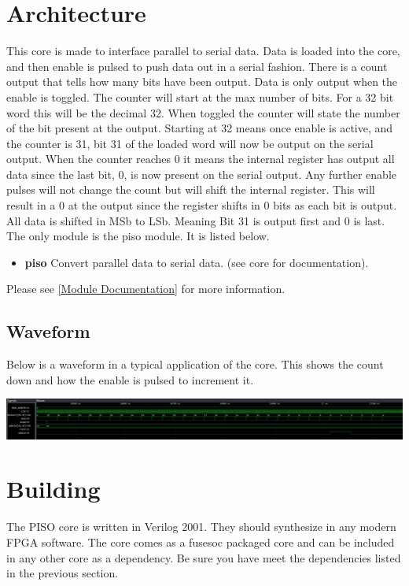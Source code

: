 \section{Architecture}
\par
This core is made to interface parallel to serial data. Data is loaded into the core, and then enable is pulsed to
push data out in a serial fashion. There is a count output that tells how many bits have been output. Data is only output
when the enable is toggled. The counter will start at the max number of bits. For a 32 bit word this will be the decimal 32.
When toggled the counter will state the number of the bit present at the output. Starting at 32 means once enable is active,
and the counter is 31, bit 31 of the loaded word will now be output on the serial output. When the counter reaches 0 it means
the internal register has output all data since the last bit, 0, is now present on the serial output. Any further enable
pulses will not change the count but will shift the internal register. This will result in a 0 at the output since the register
shifts in 0 bits as each bit is output. All data is shifted in MSb to LSb. Meaning Bit 31 is output first and 0 is last.
The only module is the piso module. It is listed below.

\begin{itemize}
  \item \textbf{piso} Convert parallel data to serial data. (see core for documentation).
\end{itemize}

Please see \ref{Module Documentation} for more information.

\subsection{Waveform}
Below is a waveform in a typical application of the core. This shows the count down and how the enable is pulsed to increment it.

\includegraphics[width=\textwidth]{src/diagrams/waveform.png}

\section{Building}

\par
The PISO core is written in Verilog 2001. They should synthesize in any modern FPGA software. The core comes as a fusesoc packaged core and can be included in any other core as a dependency. Be sure you have meet the dependencies listed in the previous section.

